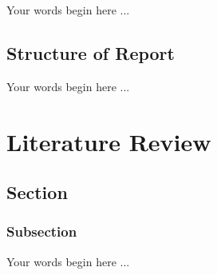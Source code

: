 \documentclass[oneside]{ecsthesis}       %
\begin{document}
Your words begin here ...

\section{Structure of Report}\label{structure-of-report}

Your words begin here ...


\chapter{Literature Review} \label{Chapter:LiteratureReview}


\section{Section}\label{section}


\subsection{Subsection}\label{subsection}

Your words begin here ... \cite{vihman1994word}
\end{document}
